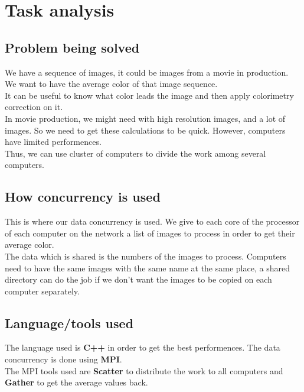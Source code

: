 \section{Task analysis}

\subsection{Problem being solved}
We have a sequence of images, it could be images from a movie in production. We want to have the average color of that image sequence.\\
It can be useful to know what color leads the image and then apply colorimetry correction on it.\\
In movie production, we might need with high resolution images, and a lot of images. So we need to get these calculations to be quick. However, computers have limited performences.\\
Thus, we can use cluster of computers to divide the work among several computers.\\
\subsection{How concurrency is used}
This is where our data concurrency is used. We give to each core of the processor of each computer on the network a list of images to process in order to get their average color.\\
The data which is shared is the numbers of the images to process. Computers need to have the same images with the same name at the same place, a shared directory can do the job if we don't want the images to be copied on each computer separately.
\subsection{Language/tools used}
The language used is \textbf{C++} in order to get the best performences. The data concurrency is done using \textbf{MPI}.\\
The MPI tools used are \textbf{Scatter} to distribute the work to all computers and \textbf{Gather} to get the average values back.